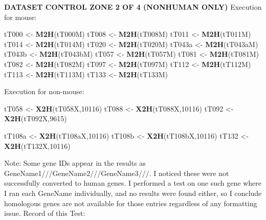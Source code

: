 \documentclass[
]{article}
\newenvironment{Shaded}{\begin{snugshade}}{\end{snugshade}}
\newcommand{\DecValTok}[1]{\textcolor[rgb]{0.00,0.00,0.81}{#1}}
\newcommand{\KeywordTok}[1]{\textcolor[rgb]{0.13,0.29,0.53}{\textbf{#1}}}
\newcommand{\NormalTok}[1]{#1}
\newcommand{\StringTok}[1]{\textcolor[rgb]{0.31,0.60,0.02}{#1}}
\begin{document}
\textbf{DATASET CONTROL ZONE 2 OF 4 (NONHUMAN ONLY)} Execution for
mouse:

\begin{Shaded}
\begin{Highlighting}[]
\NormalTok{tT000 <-}\StringTok{ }\KeywordTok{M2H}\NormalTok{(tT000M)}
\NormalTok{tT008 <-}\StringTok{ }\KeywordTok{M2H}\NormalTok{(tT008M)}
\NormalTok{tT011 <-}\StringTok{ }\KeywordTok{M2H}\NormalTok{(tT011M)}
\NormalTok{tT014 <-}\StringTok{ }\KeywordTok{M2H}\NormalTok{(tT014M)}
\NormalTok{tT020 <-}\StringTok{ }\KeywordTok{M2H}\NormalTok{(tT020M)}
\NormalTok{tT043a <-}\StringTok{ }\KeywordTok{M2H}\NormalTok{(tT043aM)}
\NormalTok{tT043b <-}\StringTok{ }\KeywordTok{M2H}\NormalTok{(tT043bM)}
\NormalTok{tT057 <-}\StringTok{ }\KeywordTok{M2H}\NormalTok{(tT057M)}
\NormalTok{tT081 <-}\StringTok{ }\KeywordTok{M2H}\NormalTok{(tT081M)}
\NormalTok{tT082 <-}\StringTok{ }\KeywordTok{M2H}\NormalTok{(tT082M)}
\NormalTok{tT097 <-}\StringTok{ }\KeywordTok{M2H}\NormalTok{(tT097M)}
\NormalTok{tT112 <-}\StringTok{ }\KeywordTok{M2H}\NormalTok{(tT112M)}
\NormalTok{tT113 <-}\StringTok{ }\KeywordTok{M2H}\NormalTok{(tT113M)}
\NormalTok{tT133 <-}\StringTok{ }\KeywordTok{M2H}\NormalTok{(tT133M)}
\end{Highlighting}
\end{Shaded}

Execution for non-mouse:

\begin{Shaded}
\begin{Highlighting}[]
\NormalTok{tT058 <-}\StringTok{ }\KeywordTok{X2H}\NormalTok{(tT058X,}\DecValTok{10116}\NormalTok{)}
\NormalTok{tT088 <-}\StringTok{ }\KeywordTok{X2H}\NormalTok{(tT088X,}\DecValTok{10116}\NormalTok{)}
\NormalTok{tT092 <-}\StringTok{ }\KeywordTok{X2H}\NormalTok{(tT092X,}\DecValTok{9615}\NormalTok{)}

\NormalTok{tT108a <-}\StringTok{ }\KeywordTok{X2H}\NormalTok{(tT108aX,}\DecValTok{10116}\NormalTok{)}
\NormalTok{tT108b <-}\StringTok{ }\KeywordTok{X2H}\NormalTok{(tT108bX,}\DecValTok{10116}\NormalTok{)}
\NormalTok{tT132 <-}\StringTok{ }\KeywordTok{X2H}\NormalTok{(tT132X,}\DecValTok{10116}\NormalTok{)}
\end{Highlighting}
\end{Shaded}

Note: Some gene IDs appear in the results as
GeneName1///GeneName2///GeneName3///. I noticed these were not
successfully converted to human genes. I performed a test on one such
gene where I ran each GeneName individually, and no results were found
either, so I conclude homologous genes are not available for those
entries regardless of any formatting issue. Record of this Test:
\end{document}
